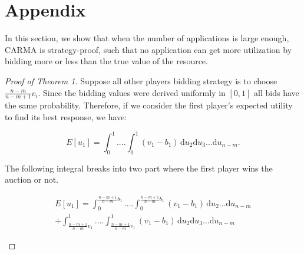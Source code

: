 \section{Appendix}
In this section, we show that when the number of applications is large enough, CARMA is strategy-proof, such that no application can get more utilization by bidding more or less than the true value of the resource. 
\vspace{0.5\baselineskip}
\begin{proof}[Proof of Theorem 1]%
Suppose all other players bidding strategy is to choose $\frac{n-m}{n-m+1}v_i$. Since the bidding values were derived uniformly in $[0, 1]$ all bids have the same probability. Therefore, if we consider the first player's expected utility to find its best response, we have:
\begin{small}
\begin{equation}
E[u_1] = \int_0^1  .... \int_0^1 \! (v_1 -b_1) \, \mathrm{d}u_2 \mathrm{d}u_3 ... \mathrm{d}u_{n-m} .  
\end{equation}
\end{small}
The following integral breaks into two part where the first player wins the auction or not. 
\begin{small}
\begin{align}
E[u_1] = \int_0^{\frac{n-m+1}{n-m}b_1}  .... \int_0^{\frac{n-m+1}{n-m}b_1} \! (v_1 -b_1) \, \mathrm{d}u_2 ... \mathrm{d}u_{n-m}  \nonumber \\
 + \int_{\frac{n-m+1}{n-m}v_1}^1  .... \int_{\frac{n-m+1}{n-m}v_1}^1 \! (v_1 -b_1) \, \mathrm{d}u_2 \mathrm{d}u_3 ... \mathrm{d}u_{n-m} 
\end{align}
\end{small}

\end{proof}
